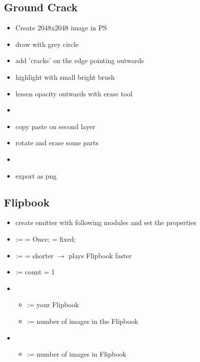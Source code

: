         \subsection{Ground Crack}
            \begin{itemize}
                \item Create 2048x2048 image in PS
                \item draw with grey circle
                \item add 'cracks' on the edge pointing outwards
                \item highlight with small bright brush
                \item lessen opacity outwards with erase tool
                \item 
                \item copy paste on second layer
                \item rotate and erase some parts
                \item 
                \item export as png
            \end{itemize}


        \subsection{Flipbook}
            \begin{itemize}
                \item create emitter with following modules and set the properties
                \item {} :=  = Once;  = fixed;
                \item {} :=  = shorter $\rightarrow$ plays Flipbook faster
                \item {} :=  count = 1
                \item {}
                    \begin{itemize}
                        \item {} := your Flipbook
                        \item {} := number of images in the Flipbook
                    \end{itemize}
                \item {}
                    \begin{itemize}
                        \item {} := number of images in Flipbook
                    \end{itemize}
            \end{itemize}


